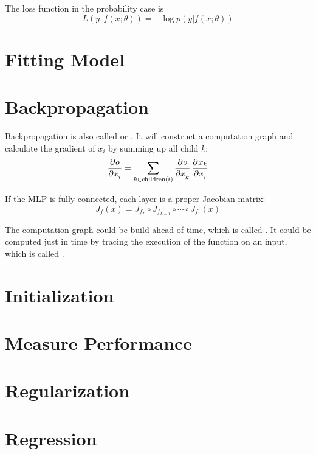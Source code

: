     The loss function in the probability case is 
    \begin{equation}
        L(y, f(x;\theta)) = - \log p(y|f(x;\theta))
    \end{equation}




\section{Fitting Model}


\section{Backpropagation}

Backpropagation is also called  or . It will construct a computation graph and calculate the gradient of $x_i$ by summing up all child $k$:
\begin{equation}
    \dpd{o}{x_i} = \sum_{k \in \text{children}(i)} \dpd{o}{x_k} \dpd{x_k}{x_i}
\end{equation}

If the MLP is fully connected, each layer is a proper Jacobian matrix:
\begin{equation}
    J_f(x) = J_{f_L} \circ J_{f_{L-1}} \circ \cdots \circ J_{f_1}(x)
\end{equation}

The computation graph could be build ahead of time, which is called . It could be computed just in time by tracing the execution of the function on an input, which is called .



\section{Initialization}



\section{Measure Performance}

\section{Regularization}


\section{Regression}

